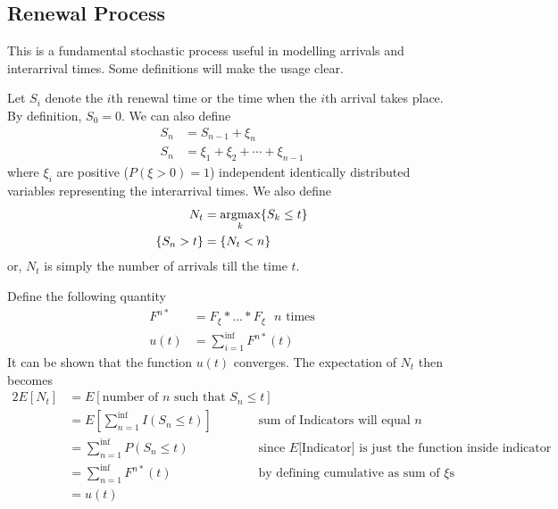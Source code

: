 \documentclass[../probability-notes.tex]{subfiles}
\begin{document}
    \subsection{Renewal Process}
    This is a fundamental stochastic process useful in modelling arrivals and interarrival times. Some definitions will make the usage clear.\newline

    Let $S_{i}$ denote the $i$th renewal time or the time when the $i$th arrival takes place. By definition, $S_{0} = 0$. We can also define
    \begin{align*}
        S_{n} &= S_{n-1} + \xi_{n}\\
        S_{n} &= \xi_{1} + \xi_{2} + \cdots + \xi_{n-1}
    \end{align*}
    where $\xi_{i}$ are positive ($P(\xi > 0) = 1$) independent identically distributed variables representing the interarrival times. We also define
    \begin{align*}
        N_{t} &= \operatorname*{argmax}_{k} \{ S_{k} \leq t \}\\
        \{ S_{n} > t \} &= \{ N_{t} < n \}
    \end{align*}
    or, $N_{t}$ is simply the number of arrivals till the time $t$.\newline

    Define the following quantity
    \begin{align*}
        F^{n*} &= F_{\xi} * \ldots * F_{\xi} \text{ $n$ times}\\
        u(t) &= \sum_{i=1}^{\inf} F^{n*}(t)
    \end{align*}
    It can be shown that the function $u(t)$ converges. The expectation of $N_{t}$ then becomes
    \begin{alignat*}{2}
        E[N_{t}] &= E[\text{number of $n$ such that $S_{n} \leq t$}]\\
        &= E[\sum_{n=1}^{\inf} I(S_{n} \leq t)] &\text{ sum of Indicators will equal $n$}\\
        &= \sum_{n=1}^{\inf} P(S_{n} \leq t) &\text{ since $E[$Indicator$]$ is just the function inside indicator}\\
        &= \sum_{n=1}^{\inf} F^{n*}(t) &\text{ by defining cumulative as sum of $\xi$s}\\
        &= u(t)
    \end{alignat*}
\end{document}
